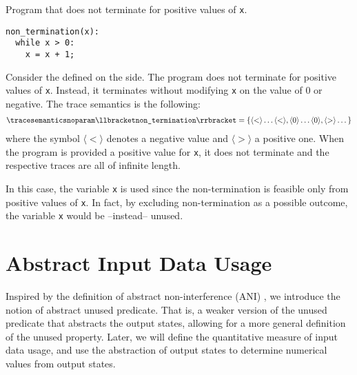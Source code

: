 \begin{example}
  \begin{marginlisting}
    \caption{Program that does not terminate for positive values of \texttt{x}.}
    \vspace{10pt}
  \begin{lstlisting}
non_termination(x):
  while x > 0:
    x = x + 1;
\end{lstlisting}
  \end{marginlisting}
  Consider the  defined on the side. The program does not terminate for positive values of \texttt{x}. Instead, it terminates without modifying \texttt{x} on the value of $0$ or negative. The trace semantics is the following:
  \begin{align*}
    \tracesemanticsnoparam\semanticsof{\texttt{non\_termination}}
    =
    \{
      \langle{<}\rangle\dots\langle{<}\rangle,
      \langle{0}\rangle\dots\langle{0}\rangle,
      \langle{>}\rangle\dots
    \}
  \end{align*}
  where the symbol $\langle{<}\rangle$ denotes a negative value and $\langle{>}\rangle$ a positive one. When the program is provided a positive value for \texttt{x}, it does not terminate and the respective traces are all of infinite length.

  In this case, the variable \texttt{x} is used since the non-termination is feasible only from positive values of \texttt{x}.
  In fact, by excluding non-termination as a possible outcome, the variable \texttt{x} would be --instead-- unused.
\end{example}

\section{Abstract Input Data Usage}

Inspired by the definition of abstract non-interference (ANI) , we introduce the notion of abstract unused predicate.
That is, a weaker version of the unused predicate that abstracts the output states, allowing for a more general definition of the unused property.
Later, we will define the quantitative measure of input data usage, and use the abstraction of output states to determine numerical values from output states.


